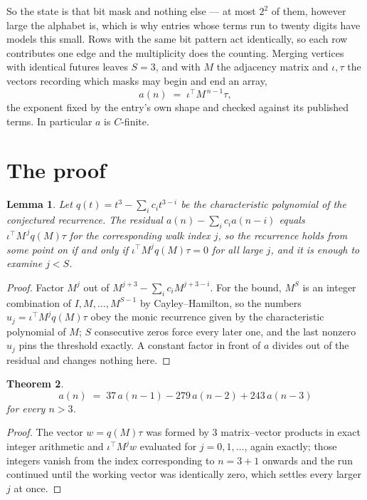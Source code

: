 \documentclass[11pt,a4paper]{article}
\theoremstyle{plain}
\newtheorem{theorem}{Theorem}
\newtheorem{lemma}[theorem]{Lemma}
\theoremstyle{definition}
\begin{document}
So the state is that bit mask and nothing else --- at most $2^{2}$ of them, however large the alphabet is, which is why entries whose terms run to twenty digits have models this small. Rows with the same bit pattern act identically, so each row contributes one edge and the multiplicity does the counting. Merging vertices with identical futures leaves $S=3$, and with $M$ the adjacency matrix and $\iota,\tau$ the vectors recording which masks may begin and end an array,
\[
a(n)\;=\;\iota^{\!\top}M^{\,n-1}\tau ,
\]
the exponent fixed by the entry's own shape and checked against its published terms. In
particular $a$ is $C$-finite.

\section{The proof}

\begin{lemma}\label{lem:crit}
Let $q(t)=t^{3}-\sum_i c_it^{3-i}$ be the characteristic polynomial of the
conjectured recurrence. The residual $a(n)-\sum_ic_ia(n-i)$ equals
$\iota^{\!\top}M^{\,j}q(M)\tau$ for the corresponding walk index $j$, so the recurrence
holds from some point on if and only if $\iota^{\!\top}M^{j}q(M)\tau=0$ for all large $j$,
and it is enough to examine $j<S$.
\end{lemma}

\begin{proof}
Factor $M^{j}$ out of $M^{j+3}-\sum_ic_iM^{j+3-i}$. For the bound, $M^{S}$
is an integer combination of $I,M,\dots,M^{S-1}$ by Cayley--Hamilton, so the numbers
$u_j=\iota^{\!\top}M^{j}q(M)\tau$ obey the monic recurrence given by the characteristic
polynomial of $M$; $S$ consecutive zeros force every later one, and the last nonzero $u_j$
pins the threshold exactly. A constant factor in front of $a$ divides out of the residual and
changes nothing here.
\end{proof}

\begin{theorem}
\[
a(n)\;=\;37\,a(n-1) - 279\,a(n-2) + 243\,a(n-3)
\]
for every $n>3$.
\end{theorem}

\begin{proof}
The vector $w=q(M)\tau$ was formed by $3$ matrix--vector products in exact integer
arithmetic and $\iota^{\!\top}M^{j}w$ evaluated for $j=0,1,\dots$, again exactly; those
integers vanish from the index corresponding to $n=3+1$ onwards and the run continued
until the working vector was identically zero, which settles every larger $j$ at once.
\end{proof}
\end{document}
